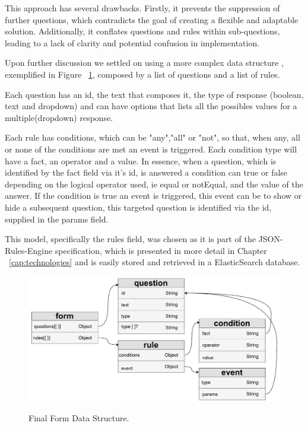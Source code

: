 This approach has several drawbacks. Firstly, it prevents the suppression of further questions, which contradicts the goal of creating a flexible and adaptable solution. Additionally, it conflates questions and rules within sub-questions, leading to a lack of clarity and potential confusion in implementation.

Upon further discussion we settled on using a more complex data structure , exemplified in Figure ~\ref{fig:new_form}, composed by a list of questions and a list of rules.

Each question has an id, the text that composes it, the type of response (boolean, text and dropdown) and can have options that lists all the possibles values for a multiple(dropdown) response.

Each rule has conditions, which can be "any","all" or "not", so that, when any, all or none of the conditions are met an event is triggered.
Each condition type will have a fact, an operator and a value. In essence, when a question, which is identified by the fact field via it's id, is answered a condition can true or false depending on the logical operator used, ie equal or notEqual, and the value of the answer. If the condition is true an event is triggered, this event can be to show or hide a subsequent question, this targeted question is identified via the id, supplied in the params field.

This model, specifically the rules field, was chosen as it is part of the JSON-Rules-Engine specification, which is presented in more detail in Chapter ~\ref{cap:technologies} and is easily stored and retrieved in a ElasticSearch database.

\begin{figure}[htbp]
	\begin{center}
		{\includegraphics[width=\textwidth,height=\textheight,keepaspectratio]{./figures/newForm.pdf}}
	\end{center}
	\caption{Final Form Data Structure.}\label{fig:new_form}
\end{figure}
\FloatBarrier

